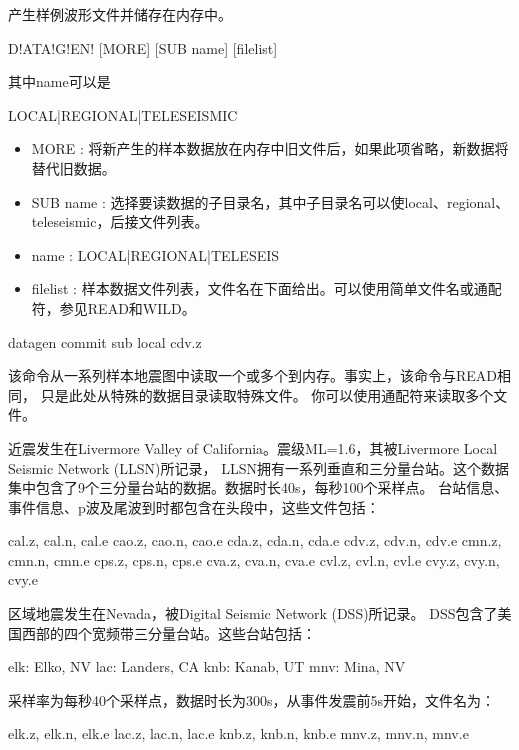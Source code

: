 \label{cmd:datagen}

产生样例波形文件并储存在内存中。

\begin{SACSTX}
D!ATA!G!EN! [MORE] [SUB name] [filelist]
\end{SACSTX}
其中name可以是
\begin{SACSTX}
LOCAL|REGIONAL|TELESEISMIC
\end{SACSTX}

\begin{itemize}
\item MORE : 将新产生的样本数据放在内存中旧文件后，如果此项省略，新数据将替代旧数据。
\item SUB name : 选择要读数据的子目录名，其中子目录名可以使local、regional、teleseismic，后接文件列表。
\item name : LOCAL|REGIONAL|TELESEIS
\item filelist : 样本数据文件列表，文件名在下面给出。可以使用简单文件名或通配符，参见READ和WILD。
\end{itemize}

\begin{SACDFT}
datagen commit sub local cdv.z
\end{SACDFT}

该命令从一系列样本地震图中读取一个或多个到内存。事实上，该命令与READ相同，
只是此处从特殊的数据目录读取特殊文件。
你可以使用通配符来读取多个文件。

近震发生在Livermore Valley of California。震级ML=1.6，其被Livermore Local Seismic Network (LLSN)所记录，
LLSN拥有一系列垂直和三分量台站。这个数据集中包含了9个三分量台站的数据。数据时长40s，每秒100个采样点。
台站信息、事件信息、p波及尾波到时都包含在头段中，这些文件包括：
\begin{SACCode}
    cal.z, cal.n, cal.e
    cao.z, cao.n, cao.e
    cda.z, cda.n, cda.e
    cdv.z, cdv.n, cdv.e
    cmn.z, cmn.n, cmn.e
    cps.z, cps.n, cps.e
    cva.z, cva.n, cva.e
    cvl.z, cvl.n, cvl.e
    cvy.z, cvy.n, cvy.e
\end{SACCode}

区域地震发生在Nevada，被Digital Seismic Network (DSS)所记录。 DSS包含了美国西部的四个宽频带三分量台站。这些台站包括：
\begin{SACCode}
    elk: Elko, NV
    lac: Landers, CA
    knb: Kanab, UT
    mnv: Mina, NV
\end{SACCode}
采样率为每秒40个采样点，数据时长为300s，从事件发震前5s开始，文件名为：
\begin{SACCode}
    elk.z, elk.n, elk.e
    lac.z, lac.n, lac.e
    knb.z, knb.n, knb.e
    mnv.z, mnv.n, mnv.e
\end{SACCode}


